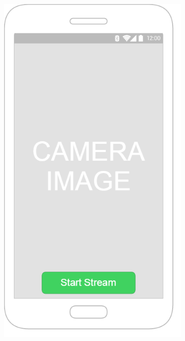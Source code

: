 \documentclass{article}
\begin{document}
\begin{figure}
        \centering
        \begin{subfigure}[b]{0.5\textwidth}
                \includegraphics[width=\textwidth]{EmergencyAppIteration1/iteration1videocallStart}
        \end{subfigure}%
        ~ %

\end{figure}
\end{document}
